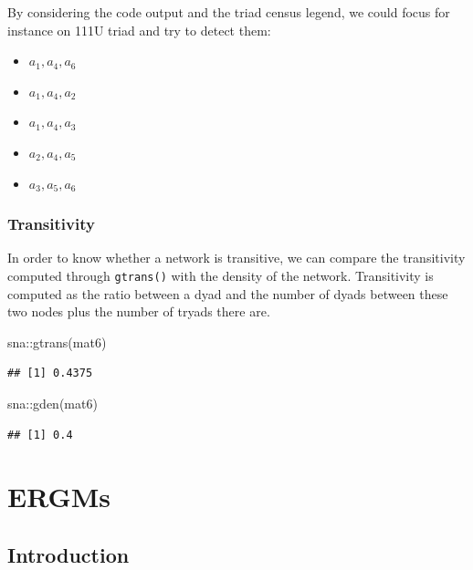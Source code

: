 \documentclass[
  notitlepage,
  onecolumn,
  openany]{book}
\newenvironment{Shaded}{\begin{snugshade}}{\end{snugshade}}
\newcommand{\FunctionTok}[1]{\textcolor[rgb]{0.00,0.00,0.00}{#1}}
\newcommand{\NormalTok}[1]{#1}
\newcommand{\SpecialCharTok}[1]{\textcolor[rgb]{0.00,0.00,0.00}{#1}}
\providecommand{\tightlist}{%
  \setlength{\itemsep}{0pt}\setlength{\parskip}{0pt}}
\begin{document}
By considering the code output and the triad census legend, we could focus for instance on 111U triad and try to detect them:

\begin{itemize}
\tightlist
\item
  \(a_1, a_4, a_6\)
\item
  \(a_1, a_4, a_2\)
\item
  \(a_1, a_4, a_3\)
\item
  \(a_2, a_4, a_5\)
\item
  \(a_3, a_5, a_6\)
\end{itemize}

\hypertarget{transitivity}{%
\subsection{Transitivity}\label{transitivity}}

In order to know whether a network is transitive, we can compare the transitivity computed through \texttt{gtrans()} with the density of the network. Transitivity is computed as the ratio between a dyad and the number of dyads between these two nodes plus the number of tryads there are.

\begin{Shaded}
\begin{Highlighting}[]
\NormalTok{sna}\SpecialCharTok{::}\FunctionTok{gtrans}\NormalTok{(mat6)}
\end{Highlighting}
\end{Shaded}

\begin{verbatim}
## [1] 0.4375
\end{verbatim}

\begin{Shaded}
\begin{Highlighting}[]
\NormalTok{sna}\SpecialCharTok{::}\FunctionTok{gden}\NormalTok{(mat6)}
\end{Highlighting}
\end{Shaded}

\begin{verbatim}
## [1] 0.4
\end{verbatim}

\hypertarget{ergms}{%
\chapter{ERGMs}\label{ergms}}

\hypertarget{introduction-1}{%
\section{Introduction}\label{introduction-1}}
\end{document}
